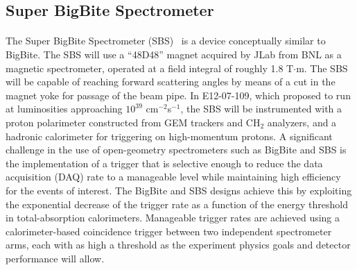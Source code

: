 \subsection{Super BigBite Spectrometer}
\paragraph{}
The Super BigBite Spectrometer (SBS)~\cite{SBS_CDR,SBS_CDR_NEW} is a device conceptually similar to BigBite. The SBS will use a ``48D48'' magnet acquired by JLab from BNL as a magnetic spectrometer, operated at a field integral of roughly 1.8 T$\cdot$m. The SBS will be capable of reaching forward scattering angles by means of a cut in the magnet yoke for passage of the beam pipe. In E12-07-109, which proposed to run at luminosities approaching $10^{39}$ cm$^{-2}$s$^{-1}$, the SBS will be instrumented with a proton polarimeter constructed from GEM trackers and CH$_2$ analyzers, and a hadronic calorimeter for triggering on high-momentum protons. %
A significant challenge in the use of open-geometry spectrometers such as BigBite and SBS is the implementation of a trigger that is selective enough to reduce the data acquisition (DAQ) rate to a manageable level while maintaining high efficiency for the events of interest. The BigBite and SBS designs achieve this by exploiting the exponential decrease of the trigger rate as a function of the energy threshold in total-absorption calorimeters. Manageable trigger rates are achieved using a calorimeter-based coincidence trigger between two independent spectrometer arms, each with as high a threshold as the experiment physics goals and detector performance will allow. %


